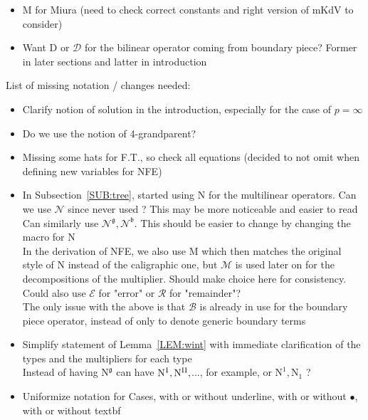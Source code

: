 \documentclass[%
11pt,  reqno]{amsart}
\newcommand{\I}{\hspace{0.2mm}\textup{I}\hspace{0.2mm}}
\newcommand{\5}{\textup{V}}
\theoremstyle{remark}
\newcommand{\bul}{\bullet}
\newcommand{\bfrak}{\mathfrak{b}}
\newcommand{\gfrak}{\mathfrak{g}}
\newcommand{\B}{\mathcal{B}}
\numberwithin{equation}{section}
\numberwithin{theorem}{section}
\newcommand{\MM}{\mathrm{M}}
\newcommand{\NN}{\mathrm{N}}
\newcommand{\D}{\mathrm{D}}
\newcommand{\DD}{\mathcal{D}}
\begin{document}
\begin{itemize}
\item $\MM$ for Miura (need to check correct constants and right version of mKdV to consider)

\item Want $\D$ or $\DD$ for the bilinear operator coming from boundary piece? Former in later sections and latter in introduction
    
\end{itemize}
    
    List of missing notation / changes needed:
    \begin{itemize}

    \item Clarify notion of solution in the introduction, especially for the case of $p=\infty$

    
    \item Do we use the notion of 4-grandparent?

    \item Missing some hats for F.T., so check all equations (decided to not omit when defining new variables for NFE)


\item In Subsection~\ref{SUB:tree}, started using $\NN$ for the multilinear operators. Can we use $\mathcal{N}$ since never used ? This may be more noticeable and easier to read
\\
Can similarly use $\mathcal{N}^{\gfrak}, \mathcal{N}^{\bfrak}$. This should be easier to change by changing the macro for $\NN$
\\
In the derivation of NFE, we also use $\mathrm{M}$ which then matches the original style of $\NN$ instead of the caligraphic one, but $\mathcal{M}$ is used later on for the decompositions of the multiplier. 
Should make choice here for consistency. Could also use $\mathcal{E}$ for "error" or $\mathcal{R}$ for "remainder"?
\\
The only issue with the above is that $\B$ is already in use for the boundary piece operator, instead of only to denote generic boundary terms



\item Simplify statement of Lemma~\ref{LEM:wint} with immediate clarification of the types and the multipliers for each type
\\
Instead of having $\NN^\gfrak $ can have $\NN^{\I}, \NN^{\rm II},$..., for example, or $\NN^1, \NN_1$ ?

\item Uniformize notation for Cases, with or without underline, with or without $\bul$, with or without textbf


\end{itemize}
\end{document}
